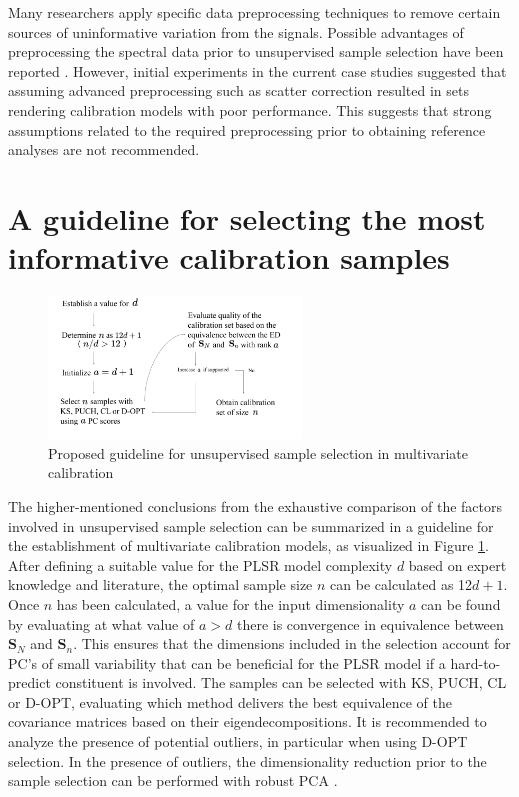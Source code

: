 \documentclass[journal=ancham,manuscript=article]{achemso}
\begin{document}
Many researchers apply specific data preprocessing techniques to remove certain sources of uninformative variation from the signals. Possible advantages of preprocessing the spectral data prior to unsupervised sample selection have been reported \cite{Liu2019}.
However, initial experiments in the current case studies suggested that assuming advanced preprocessing such as scatter correction resulted in sets rendering calibration models with poor performance. This suggests that strong assumptions related to the required preprocessing prior to obtaining reference analyses are not recommended.


\section{A guideline for selecting the most informative calibration samples}\label{scheme}


\begin{figure}[H]
\includegraphics[width=0.6\textwidth]{manuscript/figures/scheme.png}
\centering
\caption{Proposed guideline for unsupervised sample selection in multivariate calibration}
\label{fig_scheme}
\end{figure}

The higher-mentioned conclusions from the exhaustive comparison of the factors involved in unsupervised sample selection can be summarized in a guideline for the establishment of multivariate calibration models, as visualized in Figure \ref{fig_scheme}. After defining a suitable value for the PLSR model complexity $d$ based on expert knowledge and literature, the optimal sample size $n$ can be calculated as 12$d+1$. Once $n$ has been calculated, a value for the input dimensionality $a$ can be found by evaluating at what value of $a>d$ there is convergence in equivalence between $\mathbf{S}_N$ and $\mathbf{S}_n$. This ensures that the dimensions included in the selection account for PC's of small variability that can be beneficial for the PLSR model if a hard-to-predict constituent is involved. The samples can be selected with KS, PUCH, CL or D-OPT, evaluating which method delivers the best equivalence of the covariance matrices based on their eigendecompositions. It is recommended to analyze the presence of potential outliers, in particular when using D-OPT selection. In the presence of outliers, the dimensionality reduction prior to the sample selection can be performed with robust PCA \cite{Hubert2005}.
\end{document}
